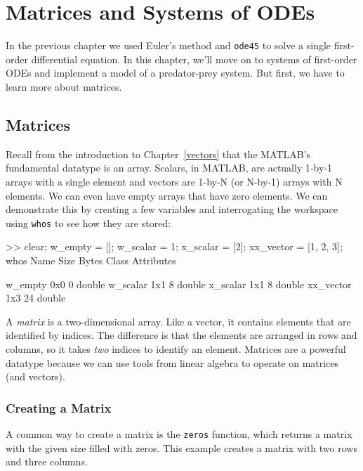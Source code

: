 \documentclass[../../book.tex]{subfiles}
\begin{document}
\chapter{Matrices and Systems of ODEs}
\label{systems}


In the previous chapter we used Euler's method and \lstinline{ode45} to solve a single first-order differential equation.  In this chapter, we'll move on to systems of first-order ODEs and implement a model of a predator-prey system.  But first, we have to learn more about matrices.


\section{Matrices}

Recall from the introduction to Chapter~\ref{vectors} that the MATLAB's fundamental datatype is an array.  Scalars, in MATLAB, are actually 1-by-1 arrays with a single element and vectors are 1-by-N (or N-by-1) arrays with N elements.  We can even have empty arrays that have zero elements. We can demonstrate this by creating a few variables and interrogating the workspace using \lstinline{whos} to see how they are stored:

\begin{code}
     >> clear;
     w_empty = [];
     w_scalar = 1;
     x_scalar = [2];
     xx_vector = [1, 2, 3];
     whos
       Name           Size            Bytes  Class     Attributes
     
       w_empty        0x0                 0  double              
       w_scalar       1x1                 8  double              
       x_scalar       1x1                 8  double              
       xx_vector      1x3                24  double    
\end{code}

A \emph{matrix} is a two-dimensional array.  Like a vector,
it contains elements that are identified by indices.  The difference
is that the elements are arranged in rows and columns, so it takes
\emph{two} indices to identify an element.  Matrices are a powerful datatype because we can use tools from linear algebra to operate on matrices (and vectors).  

\subsection{Creating a Matrix}


A common way to create a matrix is the \lstinline{zeros} function,
which returns a matrix with the given size filled with zeros.
This example creates a matrix with two rows and three columns.
\end{document}
